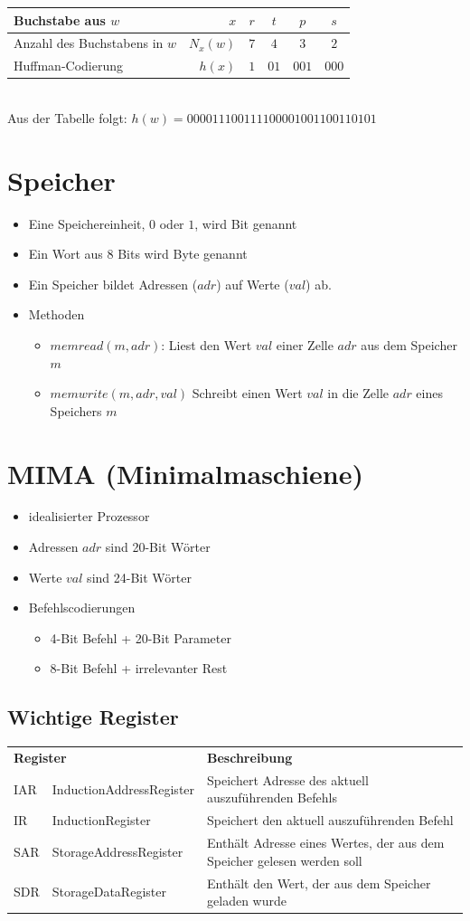 \documentclass[a4paper,portrait]{scrartcl}
\begin{document}
\hfill \break
\begin{tabular}{|l|r|c|c|c|c|}
\hline
Buchstabe aus $w$&$x$&$r$&$t$&$p$&$s$\\ \hline
Anzahl des Buchstabens in $w$&$N_{x}(w)$&$7$&$4$&$3$&$2$\\ \hline
Huffman-Codierung&$h(x)$&$1$&$01$&$001$&$000$ \\ \hline
\end{tabular} \\ 
\hfill \break
Aus der Tabelle folgt: $h(w) = 000011100111100001001100110101 $ 
\section{Speicher}
\begin{itemize}
\item Eine Speichereinheit, $0$ oder $1$, wird Bit genannt
\item Ein Wort aus $8$ Bits wird Byte genannt
\item Ein Speicher bildet Adressen ($adr$) auf Werte ($val$) ab.
\item Methoden
  \begin{itemize}
  \item $memread(m,adr)$: Liest den Wert $val$ einer Zelle $adr$ aus dem Speicher $m$
  \item $memwrite(m,adr,val)$ Schreibt einen Wert $val$ in die Zelle $adr$ eines Speichers $m$
  \end{itemize}
\end{itemize}

\section{MIMA (Minimalmaschiene)}
\begin{itemize}
\item idealisierter Prozessor
\item Adressen $adr$ sind 20-Bit Wörter
\item Werte $val$ sind 24-Bit Wörter
\item Befehlscodierungen
  \begin{itemize}
  \item 4-Bit Befehl + 20-Bit Parameter
  \item 8-Bit Befehl + irrelevanter Rest
  \end{itemize}
\end{itemize}
\subsection{Wichtige Register}
\begin{tabular}{llp{10cm}}
\multicolumn{2}{l}{\textbf{Register}}&\textbf{Beschreibung} \\
IAR&InductionAddressRegister&Speichert Adresse des aktuell auszuführenden Befehls \\
IR&InductionRegister&Speichert den aktuell auszuführenden Befehl \\
SAR&StorageAddressRegister&Enthält Adresse eines Wertes, der aus dem Speicher gelesen werden soll \\
SDR&StorageDataRegister&Enthält den Wert, der aus dem Speicher geladen wurde
\end{tabular}
\end{document}
